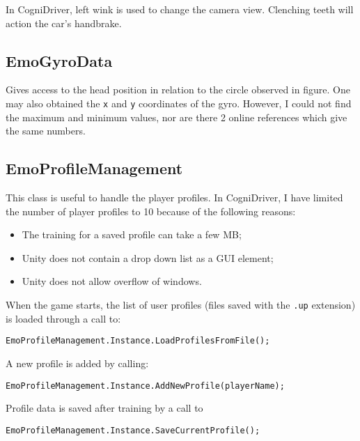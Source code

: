 In CogniDriver, left wink is used to change the camera view. Clenching teeth will action the car's handbrake. 

\subsection{EmoGyroData}
Gives access to the head position in relation to the circle observed in figure. One may also obtained the \texttt{x} and \texttt{y} coordinates of the gyro. However, I could not find the maximum and minimum values, nor are there 2 online references which give the same numbers.

\subsection{EmoProfileManagement}
This class is useful to handle the player profiles. In CogniDriver, I have limited the number of player profiles to 10 because of the following reasons:
\begin{itemize}
	\item The training for a saved profile can take a few MB;
	\item Unity does not contain a drop down list as a GUI element;
	\item Unity does not allow overflow of windows.
\end{itemize}

When the game starts, the list of user profiles (files saved with the \texttt{.up} extension) is loaded through a call to:

\begin{Verbatim}[frame=single, framesep=3mm, label={[Beginning of code]End of code}]
EmoProfileManagement.Instance.LoadProfilesFromFile();
\end{Verbatim}

A new profile is added by calling:

\begin{Verbatim}[frame=single, framesep=3mm, label={[Beginning of code]End of code}]
EmoProfileManagement.Instance.AddNewProfile(playerName);
\end{Verbatim}

Profile data is saved after training by a call to 

\begin{Verbatim}[frame=single, framesep=3mm, label={[Beginning of code]End of code}]
EmoProfileManagement.Instance.SaveCurrentProfile();
\end{Verbatim}

